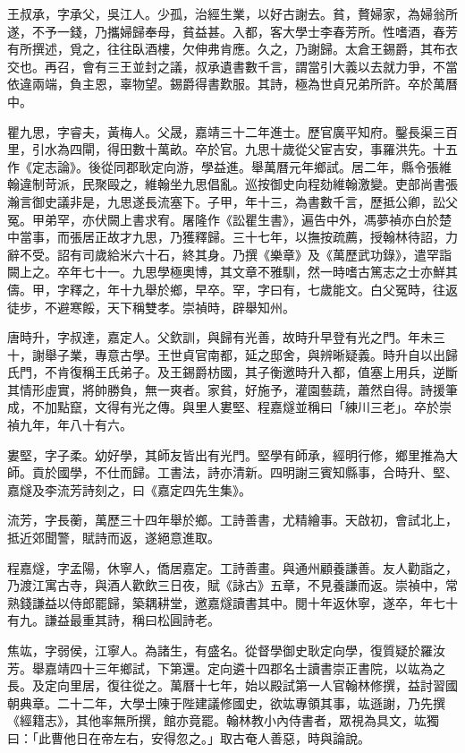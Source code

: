 \begin{pinyinscope}
王叔承，字承父，吳江人。少孤，治經生業，以好古謝去。貧，贅婦家，為婦翁所遂，不予一錢，乃攜婦歸奉母，貧益甚。入都，客大學士李春芳所。性嗜酒，春芳有所撰述，覓之，往往臥酒樓，欠伸弗肯應。久之，乃謝歸。太倉王錫爵，其布衣交也。再召，會有三王並封之議，叔承遺書數千言，謂當引大義以去就力爭，不當依違兩端，負主恩，辜物望。錫爵得書歎服。其詩，極為世貞兄弟所許。卒於萬曆中。

瞿九思，字睿夫，黃梅人。父晟，嘉靖三十二年進士。歷官廣平知府。鑿長渠三百里，引水為四閘，得田數十萬畝。卒於官。九思十歲從父宦吉安，事羅洪先。十五作《定志論》。後從同郡耿定向游，學益進。舉萬曆元年鄉試。居二年，縣令張維翰違制苛派，民聚毆之，維翰坐九思倡亂。巡按御史向程劾維翰激變。吏部尚書張瀚言御史議非是，九思遂長流塞下。子甲，年十三，為書數千言，歷抵公卿，訟父冤。甲弟罕，亦伏闕上書求宥。屠隆作《訟瞿生書》，遍告中外，馮夢禎亦白於楚中當事，而張居正故才九思，乃獲釋歸。三十七年，以撫按疏薦，授翰林待詔，力辭不受。詔有司歲給米六十石，終其身。乃撰《樂章》及《萬歷武功錄》，遣罕詣闕上之。卒年七十一。九思學極奧博，其文章不雅馴，然一時嗜古篤志之士亦鮮其儔。甲，字釋之，年十九舉於鄉，早卒。罕，字曰有，七歲能文。白父冤時，往返徒步，不避寒餒，天下稱雙孝。崇禎時，辟舉知州。

唐時升，字叔達，嘉定人。父欽訓，與歸有光善，故時升早登有光之門。年未三十，謝舉子業，專意古學。王世貞官南都，延之邸舍，與辨晰疑義。時升自以出歸氏門，不肯復稱王氏弟子。及王錫爵枋國，其子衡邀時升入都，值塞上用兵，逆斷其情形虛實，將帥勝負，無一爽者。家貧，好施予，灌園藝蔬，蕭然自得。詩援筆成，不加點竄，文得有光之傳。與里人婁堅、程嘉燧並稱曰「練川三老」。卒於崇禎九年，年八十有六。

婁堅，字子柔。幼好學，其師友皆出有光門。堅學有師承，經明行修，鄉里推為大師。貢於國學，不仕而歸。工書法，詩亦清新。四明謝三賓知縣事，合時升、堅、嘉燧及李流芳詩刻之，曰《嘉定四先生集》。

流芳，字長蘅，萬歷三十四年舉於鄉。工詩善書，尤精繪事。天啟初，會試北上，抵近郊聞警，賦詩而返，遂絕意進取。

程嘉燧，字孟陽，休寧人，僑居嘉定。工詩善畫。與通州顧養謙善。友人勸詣之，乃渡江寓古寺，與酒人歡飲三日夜，賦《詠古》五章，不見養謙而返。崇禎中，常熟錢謙益以侍郎罷歸，築耦耕堂，邀嘉燧讀書其中。閱十年返休寧，遂卒，年七十有九。謙益最重其詩，稱曰松圓詩老。

焦竑，字弱侯，江寧人。為諸生，有盛名。從督學御史耿定向學，復質疑於羅汝芳。舉嘉靖四十三年鄉試，下第還。定向遴十四郡名士讀書崇正書院，以竑為之長。及定向里居，復往從之。萬曆十七年，始以殿試第一人官翰林修撰，益討習國朝典章。二十二年，大學士陳于陛建議修國史，欲竑專領其事，竑遜謝，乃先撰《經籍志》，其他率無所撰，館亦竟罷。翰林教小內侍書者，眾視為具文，竑獨曰：「此曹他日在帝左右，安得忽之。」取古奄人善惡，時與論說。


\end{pinyinscope}
